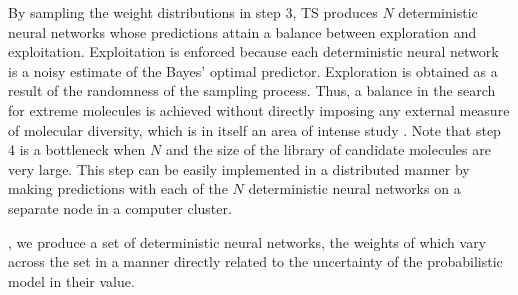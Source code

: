By sampling the weight distributions in step 3, TS produces $N$ deterministic neural networks whose predictions attain a balance between exploration and exploitation. Exploitation is enforced because each deterministic neural network is a noisy estimate of the Bayes' optimal predictor. Exploration is obtained as a result of the randomness of the sampling process. 
Thus, a balance in the search for extreme molecules is achieved without directly imposing any external measure of molecular diversity, which is in itself an area of intense study \cite{Maldonado_2006}.
Note that step 4 is a bottleneck when $N$ and the size of the library of candidate molecules are very large.
This step can be easily implemented in a distributed manner by making predictions with each of the $N$ deterministic neural networks on a separate node in a computer cluster.


, we produce a set of deterministic neural networks, the weights of which vary across the set in a manner directly related to the uncertainty of the probabilistic model in their value. 